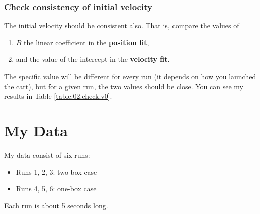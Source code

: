 \subsubsection{Check consistency of initial velocity}
%
The initial velocity should be consistent also. That is, compare the values of
\begin{enumerate}
    \item $B$ the linear coefficient in the \textbf{position fit},
    \item and the value of the intercept in the \textbf{velocity fit}.
\end{enumerate}
The specific value will be different for every run (it depends on how you launched the cart), but for a given run, the two values should be close. You can see my results in Table \ref{table:02.check.v0}.
%
\section{My Data}
%
My data consist of six runs:
\begin{itemize}
    \item Runs 1, 2, 3: two-box case
    \item Runs 4, 5, 6: one-box case
\end{itemize}
Each run is about 5 seconds long.
%
